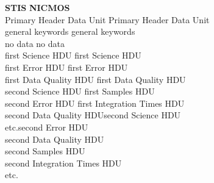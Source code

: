 \batchmode
{}
\makeatletter


\makeatother
\newenvironment{tex2html_wrap}{}{}

\pagestyle{empty}
\newpage

{\samepage \clearpage \begin{tabbing}\={\bf STIS} \hspace{2.6in} \={\bf NICMOS} \\ 
\> Primary Header Data Unit \> Primary Header Data Unit \\ 
\> \hspace{0.5in} general keywords \> \hspace{0.5in} general keywords \\ 
\> \hspace{0.5in} no data \> \hspace{0.5in} no data\\ 
\> first Science HDU \>first Science HDU\\ 
\>first Error HDU \>first Error HDU\\ 
\>first Data Quality HDU \>first Data Quality HDU\\ 
\>second Science HDU \>first Samples HDU\\ 
\>second Error HDU \>first Integration Times HDU\\ 
\>second Data Quality HDU\>second Science HDU\\ 
\>etc.\>second Error HDU\\ 
\>\>second Data Quality HDU\\ 
\>\>second Samples HDU\\ 
\>\>second Integration Times HDU\\ 
\>\>etc.
\end{tabbing}
}


\newpage

{\samepage \clearpage {}
}




